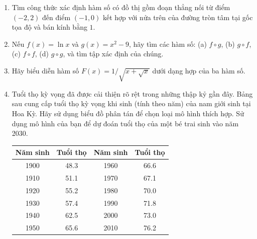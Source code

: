 \begin{minipage}[t]{0.485\textwidth}
\begin{enumerate}[label=\textbf{\arabic*.}, leftmargin=*, itemsep=2pt, topsep=1pt, parsep=0pt, start=19]
    \item Tìm công thức xác định hàm số có đồ thị gồm đoạn thẳng nối từ điểm $(-2, 2)$ đến điểm $(-1, 0)$ kết hợp với nửa trên của đường tròn tâm tại gốc tọa độ và bán kính bằng $1$.

    \item Nếu $f(x) = \ln x$ và $g(x) = x^2 - 9$, hãy tìm các hàm số: (a) $f \circ g$, (b) $g \circ f$, (c) $f \circ f$, (d) $g \circ g$, và tìm tập xác định của chúng.

    \item Hãy biểu diễn hàm số $F(x) = 1/\sqrt{x + \sqrt{x}}$ dưới dạng hợp của ba hàm số.

    \item Tuổi thọ kỳ vọng đã được cải thiện rõ rệt trong những thập kỷ gần đây. Bảng sau cung cấp tuổi thọ kỳ vọng khi sinh (tính theo năm) của nam giới sinh tại Hoa Kỳ. Hãy sử dụng biểu đồ phân tán để chọn loại mô hình thích hợp. Sử dụng mô hình của bạn để dự đoán tuổi thọ của một bé trai sinh vào năm 2030.
    \par\vspace{2pt}
    {\centering
    \small
    \renewcommand{\arraystretch}{1.05}
    \begin{tabular}{|c|c||c|c|}
    \hline
    \rowcolor{stewartcyan!15}
    \textbf{Năm sinh} & \textbf{Tuổi thọ} & \textbf{Năm sinh} & \textbf{Tuổi thọ} \\
    \hline
    1900 & 48.3 & 1960 & 66.6 \\
    1910 & 51.1 & 1970 & 67.1 \\
    1920 & 55.2 & 1980 & 70.0 \\
    1930 & 57.4 & 1990 & 71.8 \\
    1940 & 62.5 & 2000 & 73.0 \\
    1950 & 65.6 & 2010 & 76.2 \\
    \hline
    \end{tabular}\par}
\end{enumerate}
\end{minipage}